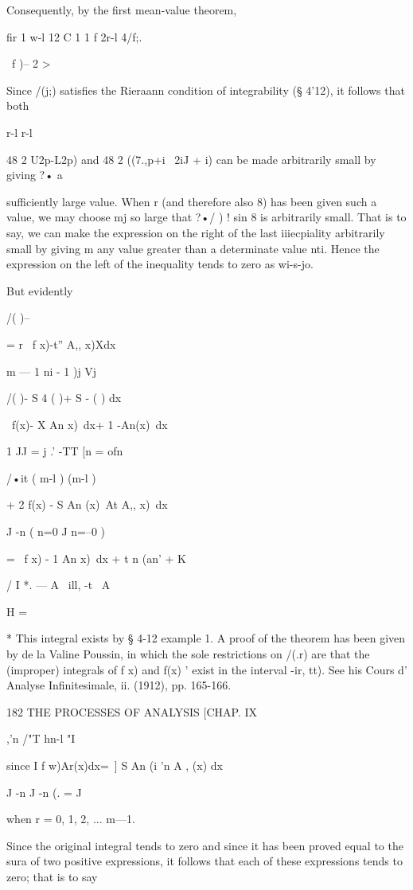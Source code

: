 Consequently, by the first mean-value theorem,

fir 1 w-l 12 C 1 1 f 2r-l 4/f;. \

\ f )-- 2 >%

Since /(j;) satisfies the Rieraann condition of integrability (§
4'12), it follows that both

r-l r-l

48 2 U2p-L2p) and 48 2 ((7.,p+i~ 2iJ + i) can be made arbitrarily
small by giving ?• a

sufficiently large value. When r (and therefore also 8) has been given
such a value, we may choose mj so large that ?•/ ) ! sin 8 is
arbitrarily small. That is to say, we can make the expression on the
right of the last iiiecpiality arbitrarily small by giving m any value
greater than a determinate value nti. Hence the expression on the left
of the inequality tends to zero as wi-s-jo.

But evidently

/( )-- %

= r \ f x)-t'' A,, x)Xdx

m — 1 ni - 1 )j Vj

/( )- S 4 ( )+ S - ( ) dx

\ f(x)- X An x)\ dx+ 1 -An(x)\ dx

1 JJ = j .' -TT [n = ofn

/•it ( m-l ) (m-l )

+ 2 f(x) - S An (x)\ At A,, x)\ dx

J -n ( n=0 J n=--0 )

= \ f x) - 1 An x)\ dx + t n (an' + K

/ I *. — A \ ill, -t \ A

H =

* This integral exists by § 4-12 example 1. A proof of the theorem has
been given by de la Valine Poussin, in which the sole restrictions on
/(.r) are that the (improper) integrals of f x) and f(x) ' exist in
the interval -ir, tt). See his Cours d' Analyse Infinitesimale, ii.
(1912), pp. 165-166.

182 THE PROCESSES OF ANALYSIS [CHAP. IX

,'n /"T hn-l "I

since I f w)Ar(x)dx=\ ] S An (i 'n A , (x) dx

J -n J -n (. = J

when r = 0, 1, 2, ... m—1.

Since the original integral tends to zero and since it has been proved
equal to the sura of two positive expressions, it follows that each of
these expressions tends to zero; that is to say


